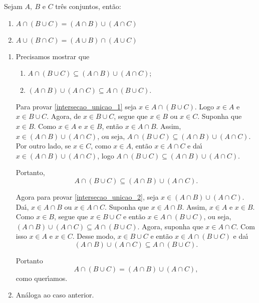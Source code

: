 \begin{proposicao} Sejam $A,\ B$ e $C$ tr{\^e}s conjuntos, ent{\~a}o:
	\begin{enumerate}[label={\roman*})]
		\item $A\cap(B\cup C)=(A\cap B)\cup(A\cap C)$
		\item $A\cup(B\cap C)=(A\cup B)\cap(A\cup C)$
	\end{enumerate}
\end{proposicao}
\begin{prova}
	\begin{enumerate}[label={\roman*})]
		\item Precisamos mostrar que
		\begin{enumerate}[label=({\arabic*})]
			\item $A\cap(B\cup C)\subseteq(A\cap B)\cup(A\cap C)$;\label{intersecao_unicao_1}
			\item $(A\cap B)\cup(A\cap C)\subseteq A\cap(B\cup C).$\label{intersecao_unicao_2}
		\end{enumerate}

		Para provar \ref{intersecao_unicao_1} seja $x\in A \cap (B \cup C)$. Logo $x\in A$ e $x\in B\cup C$. Agora, de $x\in B\cup C$, segue que $x\in B$ ou $x\in C$. Suponha que $x\in B$. Como $x\in A$ e $x \in B$, ent\~ao $x\in A\cap B$. Assim, $x\in(A\cap B)\cup(A\cap C)$, ou seja, $A\cap(B\cup C)\subseteq(A\cap B)\cup(A\cap C)$. Por outro lado, se $x\in C$, como $x\in A$, ent{\~a}o $x\in A\cap C$ e da{\'\i} $x\in(A\cap B)\cup(A\cap C)$, logo $A\cap(B\cup C)\subseteq(A\cap B)\cup(A\cap C)$.

		Portanto,
		\[
			A\cap(B\cup C)\subseteq(A\cap B)\cup(A\cap C).
		\]

		Agora para provar \ref{intersecao_unicao_2}, seja $x\in(A\cap B)\cup(A\cap C)$. Da{\'\i}, $x\in A\cap B$ ou $x\in A\cap C$. Suponha que $x\in A\cap B$. Assim, $x\in A$ e $x\in B$. Como $x\in B$, segue que $x\in B\cup C$ e ent{\~a}o $x\in A\cap(B\cup C)$, ou seja, $(A\cap B)\cup(A\cap C)\subseteq A\cap(B\cup C)$. Agora, suponha que $x\in A\cap C$. Com isso $x\in A$ e $x\in C$. Desse modo, $x\in B\cup C$ e ent{\~a}o $x\in A\cap(B\cup C)$ e da{\'\i}
		\[
			(A\cap B)\cup(A\cap C)\subseteq A\cap(B\cup C).
		\]

		Portanto
		\[
			A\cap(B\cup C)=(A\cap B)\cup(A\cap C),
		\]
		como quer{\'\i}amos.
		\item An\'aloga ao caso anterior.
	\end{enumerate}
\end{prova}

